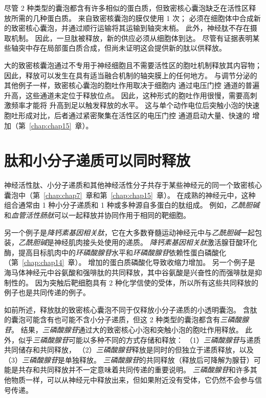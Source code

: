 尽管 2 种类型的囊泡都含有许多相似的蛋白质，但致密核心囊泡缺乏在活性区释放所需的几种蛋白质。
来自致密核囊泡的膜仅使用 1 次；
必须在细胞体中合成新的致密核心囊泡，并通过顺行运输将其运输到轴突末梢。
此外，神经肽不存在摄取机制。
因此，一旦肽被释放，新的供应必须从细胞体到达。
尽管有证据表明某些轴突中存在局部蛋白质合成，但尚未证明这会提供新的肽以供释放。


大的致密核囊泡通过不专用于神经细胞且不需要活性区的胞吐机制释放其内容物；
因此，释放可以发生在具有适当融合机制的轴突膜上的任何地方。
与调节分泌的其他例子一样，致密核心囊泡的胞吐作用取决于细胞内  通过电压门控  通道的普遍升高，这些通道未定位于释放位点。
因此，这种形式的胞吐作用很慢，需要高刺激频率才能将  升高到足以触发释放的水平。
这与单个动作电位后突触小泡的快速胞吐形成对比，后者通过紧密聚集在活性区的电压门控  通道启动大量、快速的  增加（第~\ref{chap:chap15}~章）。



\section{肽和小分子递质可以同时释放}

神经活性肽、小分子递质和其他神经活性分子共存于某些神经元的同一个致密核心囊泡中（第~\ref{chap:chap7}~章和第~\ref{chap:chap15}~章）。
在成熟的神经元中，这种组合通常由 1 种小分子递质和 1 种或多种源自多蛋白的肽组成。
例如，\textit{乙酰胆碱}和\textit{血管活性肠肽}可以一起释放并协同作用于相同的靶细胞。


另一个例子是\textit{降钙素基因相关肽}，它在大多数脊髓运动神经元中与\textit{乙酰胆碱}一起包装，\textit{乙酰胆碱}是神经肌肉接头处使用的递质。
\textit{降钙素基因相关肽}激活腺苷酸环化酶，提高目标肌肉中的\textit{环磷酸腺苷}水平和\textit{环磷酸腺苷}依赖性蛋白磷酸化（第~\ref{chap:chap14}~章）。
增加的蛋白质磷酸化导致收缩力增加。
另一个例子是海马体神经元中谷氨酸和强啡肽的共同释放，其中谷氨酸是兴奋性的而强啡肽是抑制性的。
因为突触后靶细胞具有 2 种化学信使的受体，所以所有这些共同释放的例子也是共同传递的例子。


如前所述，释放肽的致密核心囊泡不同于仅释放小分子递质的小透明囊泡。
含肽的囊泡可能含有也可能不含小分子递质，但这 2 种类型的囊泡都含有\textit{三磷酸腺苷}。
结果，\textit{三磷酸腺苷}通过大的致密核心小泡和突触小泡的胞吐作用释放。
此外，似乎\textit{三磷酸腺苷}可能以多种不同的方式存储和释放：
（1）\textit{三磷酸腺苷}与递质共同储存和共同释放，
（2）\textit{三磷酸腺苷}释放是同时的但独立于递质释放，以及 
（3）\textit{三磷酸腺苷}是单独释放。
\textit{三磷酸腺苷}的共同释放（释放后可降解为腺苷）可能是共存和共同释放并不一定意味着共同传递的重要说明。
\textit{三磷酸腺苷}和许多其他物质一样，可以从神经元中释放出来，但如果附近没有受体，它仍然不会参与信号传递。


